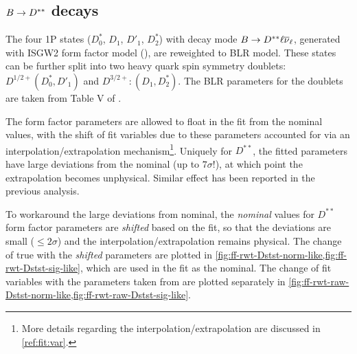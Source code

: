 \subsection{$B \rightarrow D^{**}$ decays}

The four 1P \Dstst states ($D^*_0$, $D_1$, $D'_1$, $D^*_2$) with decay mode
$B \rightarrow D^{**}{\ell}{{\overline{\nu}}_\ell}$,
generated with ISGW2 form factor model
(\cite{Scora_1995}),
are reweighted to BLR model.
These \Dstst states can be further split into two heavy quark spin symmetry
doublets: $D^{1/2+} (D^*_0, D'_1)$ and $D^{3/2+}: (D_1, D^*_2)$.
The BLR parameters for the doublets are taken from Table V of
\cite{Bernlochner_2018}.

The form factor parameters are allowed to float in the fit from the nominal
values, with the shift of fit variables due to these parameters accounted for
via an interpolation/extrapolation mechanism\footnote{
    More details regarding the interpolation/extrapolation are discussed
    in \cref{ref:fit:var}.
}.
Uniquely for $D^{**}$, the fitted parameters have large deviations from the
nominal (up to $7\sigma$!), at which point the extrapolation becomes
unphysical.
Similar effect has been reported in the previous analysis.

To workaround the large deviations from nominal, the \emph{nominal} values for
$D^{**}$ form factor parameters are \emph{shifted} based on the fit, so that
the deviations are small ($\leq 2\sigma$) and the
interpolation/extrapolation remains physical.
The change of true \qSq with the \emph{shifted} parameters are
plotted in \cref{fig:ff-rwt-Dstst-norm-like,fig:ff-rwt-Dstst-sig-like},
which are used in the fit as the nominal.
The change of fit variables with the parameters taken from
\cite{Bernlochner_2018} are plotted separately in
\cref{fig:ff-rwt-raw-Dstst-norm-like,fig:ff-rwt-raw-Dstst-sig-like}.

